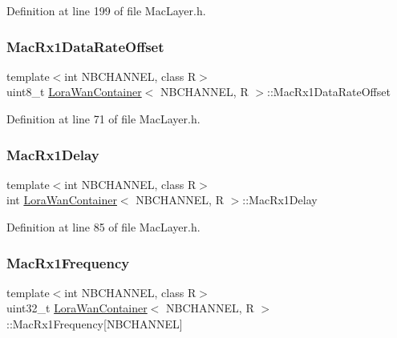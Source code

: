 Definition at line 199 of file Mac\+Layer.\+h.

\mbox{\label{class_lora_wan_container_a26d187a951c769d9419527583d70ee3c}} 
\subsubsection{\texorpdfstring{Mac\+Rx1\+Data\+Rate\+Offset}{MacRx1DataRateOffset}}
{\footnotesize\ttfamily template$<$int N\+B\+C\+H\+A\+N\+N\+EL, class R$>$ \\
uint8\+\_\+t \mbox{\hyperlink{class_lora_wan_container}{Lora\+Wan\+Container}}$<$ N\+B\+C\+H\+A\+N\+N\+EL, R $>$\+::Mac\+Rx1\+Data\+Rate\+Offset}



Definition at line 71 of file Mac\+Layer.\+h.

\mbox{\label{class_lora_wan_container_af547f45dbe7cc0255396cfa85ba9533a}} 
\subsubsection{\texorpdfstring{Mac\+Rx1\+Delay}{MacRx1Delay}}
{\footnotesize\ttfamily template$<$int N\+B\+C\+H\+A\+N\+N\+EL, class R$>$ \\
int \mbox{\hyperlink{class_lora_wan_container}{Lora\+Wan\+Container}}$<$ N\+B\+C\+H\+A\+N\+N\+EL, R $>$\+::Mac\+Rx1\+Delay}



Definition at line 85 of file Mac\+Layer.\+h.

\mbox{\label{class_lora_wan_container_ad78558332c51d4dc8cc4fde0e85a9c71}} 
\subsubsection{\texorpdfstring{Mac\+Rx1\+Frequency}{MacRx1Frequency}}
{\footnotesize\ttfamily template$<$int N\+B\+C\+H\+A\+N\+N\+EL, class R$>$ \\
uint32\+\_\+t \mbox{\hyperlink{class_lora_wan_container}{Lora\+Wan\+Container}}$<$ N\+B\+C\+H\+A\+N\+N\+EL, R $>$\+::Mac\+Rx1\+Frequency\mbox{[}N\+B\+C\+H\+A\+N\+N\+EL\mbox{]}}



